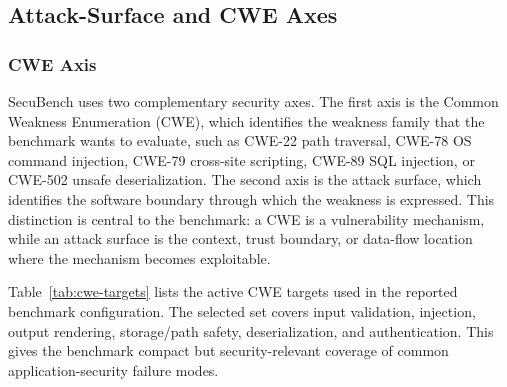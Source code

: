 \documentclass[11pt]{article}
\newcommand{\toolname}{SecuBench}
\begin{document}
\begin{table}[t]
\centering
\caption{Agent roles used by the \toolname{} pipeline.}
\label{tab:agent-stack}
\end{table}

\subsection{Attack-Surface and CWE Axes}

\subsubsection{CWE Axis}

\toolname{} uses two complementary security axes. The first axis is the Common Weakness Enumeration (CWE), which identifies the weakness family that the benchmark wants to evaluate, such as CWE-22 path traversal, CWE-78 OS command injection, CWE-79 cross-site scripting, CWE-89 SQL injection, or CWE-502 unsafe deserialization. The second axis is the attack surface, which identifies the software boundary through which the weakness is expressed. This distinction is central to the benchmark: a CWE is a vulnerability mechanism, while an attack surface is the context, trust boundary, or data-flow location where the mechanism becomes exploitable.

Table~\ref{tab:cwe-targets} lists the active CWE targets used in the reported benchmark configuration. The selected set covers input validation, injection, output rendering, storage/path safety, deserialization, and authentication. This gives the benchmark compact but security-relevant coverage of common application-security failure modes.
\end{document}
